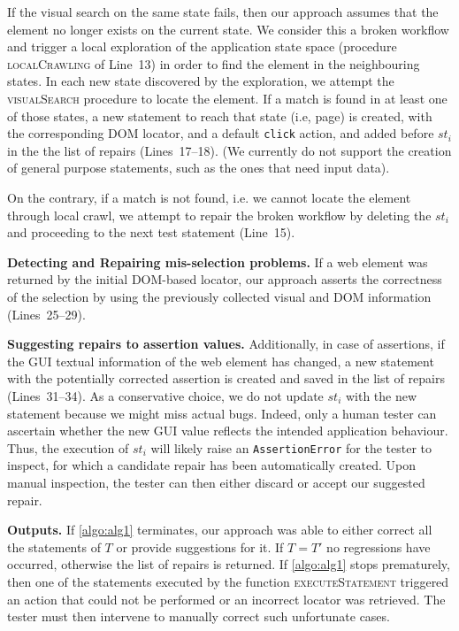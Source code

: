 If the visual search on the same state fails, then our approach assumes that the element no longer exists on the current state. We consider this a broken workflow and trigger a local exploration of the application state space (procedure \textsc{localCrawling} of Line~13) in order to find the element in the neighbouring states. In each new state discovered by the exploration, we attempt the \textsc{visualSearch} procedure to locate the element. If a match is found in at least one of those states, a new statement to reach that state (i.e, page) is created, with the corresponding DOM locator, and a default \texttt{click} action, and added before $st_i$ in the the list of repairs (Lines~17--18). (We currently do not support the creation of general purpose statements, such as the ones that need input data).

On the contrary, if a match is not found, i.e. we cannot locate the element through local crawl, we attempt to repair the broken workflow by deleting the $st_i$ and proceeding to the next test statement (Line~15).

\noindent
\textbf{Detecting and Repairing mis-selection problems.}
If a web element was returned by the initial DOM-based locator, our approach asserts the correctness of the selection by using the previously collected visual and DOM information (Lines~25--29). 

\noindent
\textbf{Suggesting repairs to assertion values.}
Additionally, in case of assertions, if the GUI textual information of the web element has changed, a new statement with the potentially corrected assertion is created and saved in the list of repairs (Lines~31--34). As a conservative choice, we do not update $st_i$ with the new statement because we might miss actual bugs.
Indeed, only a human tester can ascertain whether the new GUI value reflects the intended application behaviour. Thus, the execution of $st_i$ will likely raise an \texttt{AssertionError} for the tester to inspect, for which a candidate repair has been automatically created. Upon manual inspection, the tester can then either discard or accept our suggested repair.

\noindent
\textbf{Outputs.}
If \autoref{algo:alg1} terminates, our approach was able to either correct all the statements of $T$ or provide suggestions for it. 
 If $T = T'$ no regressions have occurred, otherwise the list of repairs is returned.
If \autoref{algo:alg1} stops prematurely, then one of the statements executed by the function \textsc{executeStatement} triggered an action that could not be performed or an incorrect locator was retrieved. The tester must then intervene to manually correct such unfortunate cases.

